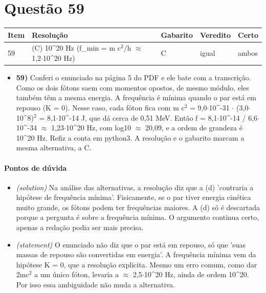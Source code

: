 \documentclass{article}%
\begin{document}
\section*{Questão 59}%
\begin{longtable}{@{}p{} p{} p{} p{} p{}@{}}\toprule Item & Resolução & Gabarito & Veredito & Certo \\ \midrule
59 & (C) 10\^{}20 Hz (f\_min = m c$^2$/h $\approx$ 1,2$\cdot$10\^{}20 Hz) & C & igual & ambos \\
\bottomrule\end{longtable}%
\begin{itemize}%
\item%
\textbf{59)} Conferi o enunciado na página 5 do PDF e ele bate com a transcrição. Como os dois fótons saem com momentos opostos, de mesmo módulo, eles também têm a mesma energia. A frequência é mínima quando o par está em repouso (K = 0). Nesse caso, cada fóton fica com m c$^2$ = 9,0$\cdot$10\^{}{-}31 $\cdot$ (3,0$\cdot$10\^{}8)$^2$ = 8,1$\cdot$10\^{}{-}14 J, que dá cerca de 0,51 MeV. Então f = 8,1$\cdot$10\^{}{-}14 / 6,6$\cdot$10\^{}{-}34 $\approx$ 1,23$\cdot$10\^{}20 Hz, com log10 $\approx$ 20,09, e a ordem de grandeza é 10\^{}20 Hz. Refiz a conta em python3. A resolução e o gabarito marcam a mesma alternativa, a C.%
\end{itemize}%
\paragraph{Pontos de dúvida}%
\begin{itemize}%
\item%
\textit{(solution)} Na análise das alternativas, a resolução diz que a (d) 'contraria a hipótese de frequência mínima'. Fisicamente, se o par tiver energia cinética muito grande, os fótons podem ter frequências maiores. A (d) só é descartada porque a pergunta é sobre a frequência mínima. O argumento continua certo, apenas a redação podia ser mais precisa.%
\item%
\textit{(statement)} O enunciado não diz que o par está em repouso, só que 'suas massas de repouso são convertidas em energia'. A frequência mínima vem da hipótese K = 0, que a resolução explicita. Mesmo um erro comum, como dar 2mc$^2$ a um único fóton, levaria a $\approx$ 2,5$\cdot$10\^{}20 Hz, ainda de ordem 10\^{}20. Por isso essa ambiguidade não muda a alternativa.%
\end{itemize}%
\end{document}
